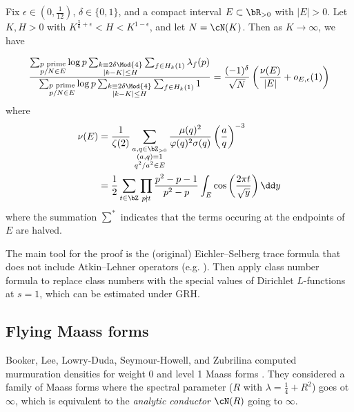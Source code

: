 \begin{theorem}
    Fix $\epsilon \in (0, \frac{1}{12})$, $\delta \in \{0, 1\}$, and a compact interval $E \subset \bR_{> 0}$ with $|E| > 0$.
    Let $K, H > 0$ with $K^{\frac{5}{6} + \epsilon} < H < K^{1 - \epsilon}$, and let $N = \cN(K)$.
    Then as $K \to \infty$, we have

    \begin{equation}
        \frac{
            \sum_{\substack{p \text{ prime} \\ p / N \in E}}
            \log p
            \sum_{\substack{k \equiv 2 \delta \Mod{4} \\ |k - K| \le H}}
            \sum_{f \in H_k(1)} \lambda_f(p)
        }
        {
            \sum_{\substack{p \text{ prime} \\ p / N \in E}} 
            \log p 
            \sum_{\substack{k \equiv 2 \delta \Mod{4} \\ |k - K| \le H}} 
            \sum_{f \in H_k(1)} 1
        } = \frac{(-1)^\delta}{\sqrt{N}} \left(\frac{\nu(E)}{|E|} + o_{E, \epsilon}(1)\right)
    \end{equation}
    where
    \begin{align}
        \nu(E) &= \frac{1}{\zeta(2)} \sum_{\substack{a, q \in \bZ_{>0} \\ (a, q) = 1 \\ q^2 / a^2 \in E}} \frac{\mu(q)^2}{\varphi(q)^2 \sigma(q)} \left(\frac{a}{q}\right)^{-3} \\
        &= \frac{1}{2} \sum_{t \in \bZ} \prod_{p \nmid t} \frac{p^2 - p - 1}{p^2 - p} \int_E \cos\left(\frac{2 \pi t}{\sqrt{y}}\right) \dd y
    \end{align}
    where the summation $\sum^{*}$ indicates that the terms occuring at the endpoints of $E$ are halved. 
\end{theorem}

The main tool for the proof is the (original) Eichler--Selberg trace formula that does not include Atkin--Lehner operators (e.g. \cite[Theorem 2.1]{child2022twist}).
Then apply class number formula to replace class numbers with the special values of Dirichlet $L$-functions at $s = 1$, which can be estimated under GRH.

\subsection{Flying Maass forms}

Booker, Lee, Lowry-Duda, Seymour-Howell, and Zubrilina computed murmuration densities for weight 0 and level 1 Maass forms \cite{booker2024murmurations}.
They considered a family of Maass forms where the spectral parameter ($R$ with $\lambda = \frac{1}{4} + R^2$) goes ot $\infty$, which is equivalent to the \emph{analytic conductor} $\cN(R)$ going to $\infty$.

